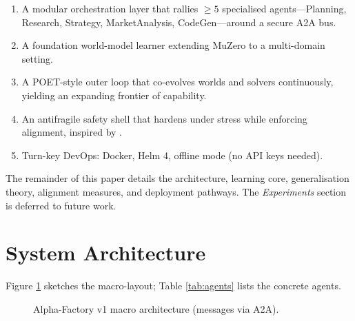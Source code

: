 \begin{enumerate}[label=\textbf{C\arabic*}.]
  \item A modular orchestration layer that rallies \(\ge5\) specialised
        agents—Planning, Research, Strategy, MarketAnalysis, CodeGen—around a
        secure \textsc{A2A} bus.
  \item A foundation world-model learner extending
        MuZero \parencite{schrittwieser2019muzero} to a multi-domain setting.
  \item A POET-style outer loop that co-evolves worlds and solvers
        continuously, yielding an expanding frontier of capability.
  \item An antifragile safety shell that hardens under stress while enforcing
        alignment, inspired by \textcite{amodei2016concrete}.
  \item Turn-key DevOps: Docker, Helm 4, offline mode (no API keys needed).
\end{enumerate}

\vspace{0.3em}
The remainder of this paper details the architecture, learning core,
generalisation theory, alignment measures, and deployment pathways.
The \emph{Experiments} section is deferred to future work.

\section{System Architecture}

Figure \ref{fig:arch} sketches the macro-layout; Table \ref{tab:agents}
lists the concrete agents.

\begin{figure}[ht]\centering
{}
\caption{Alpha-Factory v1 macro architecture (messages via \textsc{A2A}).}
\label{fig:arch}
\end{figure}

